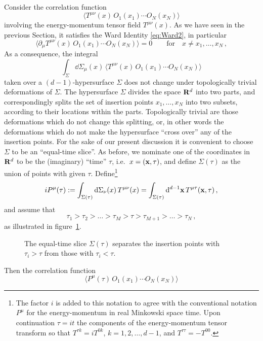Consider the correlation function
\[
\bigl\langle T^{\mu\nu}(x)\,O_1(x_1)\cdots O_N(x_N)\bigr\rangle
\]
involving the energy-momentum tensor field $T^{\mu\nu}(x)$. As we have seen in the
previous Section, it satisfies the Ward Identity \eqref{eq:Ward2}, in particular
\[
\bigl\langle\partial_\mu T^{\mu\nu}(x)\,O_1(x_1)\cdots O_N(x_N)\bigr\rangle=0\qquad\text{for}\quad x\neq x_1,\dots,x_N\,,
\]
As a consequence, the integral
\[
\int_\Sigma \dd\Sigma_\mu(x)\,\bigl\langle T^{\mu\nu}(x)\,O_1(x_1)\cdots O_N(x_N)\bigr\rangle
\]
taken over a $(d-1)$-hypersurface $\Sigma$ does not change under topologically
trivial deformations of $\Sigma$. The hypersurface $\Sigma$ divides the space
$\mathbf{R}^d$ into two parts, and correspondingly splits the set of insertion points
$x_1,\dots,x_N$ into two subsets, according to their locations within the parts.
Topologically trivial are those deformations which do not change this splitting,
or, in other words the deformations which do not make the hypersurface ``cross
over'' any of the insertion points. For the sake of our present discussion it is
convenient to choose $\Sigma$ to be an ``equal-time slice''. As before, we
nominate one of the coordinates in $\mathbf{R}^d$ to be the (imaginary) ``time'' $\tau$,
i.e.\ $x=(\mathbf{x},\tau)$, and define $\Sigma(\tau)$ as the union of points with given
$\tau$. Define\footnote{The factor $i$ is added to this notation to agree with the
conventional notation $P^\mu$ for the energy-momentum in real Minkowski space time.
Upon continuation $\tau=it$ the components of the energy-momentum tensor transform
so that $T^{\tau k}=iT^{0k}$, $k=1,2,\dots,d-1$, and $T^{\tau\tau}=-T^{00}$.}
\begin{equation}\label{eq:Pslice}
iP^\mu(\tau):=\int_{\Sigma(\tau)}\mathop{}\!\mathrm{d}\Sigma_\nu(x)\,T^{\mu\nu}(x)=\int_{\Sigma(\tau)}\mathop{}\!\mathrm{d}^{d-1}\mathbf{x}\,T^{\mu\tau}(\mathbf{x},\tau)\,,
\end{equation}
and assume that
\begin{equation}\label{eq:tauorder}
\tau_1>\tau_2>\dots>\tau_M>\tau>\tau_{M+1}>\dots>\tau_N\,,
\end{equation}
as illustrated in figure~\ref{fig:slice}.
\begin{figure}[ht]
\centering{}
\caption{The equal-time slice $\Sigma(\tau)$ separates the insertion points with
$\tau_i>\tau$ from those with $\tau_i<\tau$.}
\label{fig:slice}
\end{figure}
Then the correlation function
\begin{equation}\label{eq:Pcorr}
\bigl\langle P^\mu(\tau)\,O_1(x_1)\cdots O_N(x_N)\bigr\rangle
\end{equation}
